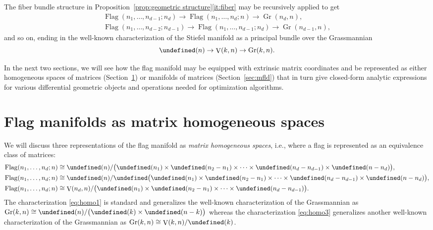 \documentclass[11pt,reqno]{amsart}%
\theoremstyle{definition}
\theoremstyle{remark}
\let\O\undefined
\let\S\undefined
\let\SO\undefined
\DeclareMathOperator{\Gr}{Gr}
\DeclareMathOperator{\V}{V}
\DeclareMathOperator{\Flag}{Flag}
\DeclareMathOperator{\O}{O}
\DeclareMathOperator{\S}{S}
\DeclareMathOperator{\SO}{SO}
\begin{document}
The fiber bundle structure in Proposition~\ref{prop:geometric structure}\eqref{it:fiber} may be recursively applied to get
\begin{gather*}
\Flag(n_1,\dots, n_{d-1};n_d) \to \Flag(n_1,\dots, n_d;n) \to \Gr(n_d,n),\\
\Flag(n_1,\dots, n_{d-2};n_{d-1}) \to \Flag(n_1,\dots, n_{d-1};n_d) \to \Gr(n_{d-1},n),
\end{gather*}
and so on, ending in the well-known characterization of the Stiefel manifold as a principal bundle over the Grassmannian
\[
\O(n) \to \V(k,n) \to \Gr(k,n).
\]

In the next two sections, we will see how the flag manifold may be equipped with extrinsic matrix coordinates and be represented as either homogeneous spaces of  matrices (Section~\ref{sec:homo}) or manifolds of matrices (Section~\ref{sec:mfld}) that in turn give closed-form analytic expressions for various differential geometric objects and operations needed for  optimization algorithms.

\section{Flag manifolds as matrix homogeneous spaces}\label{sec:homo}

We will discuss three representations of the flag manifold as \emph{matrix homogeneous spaces}, i.e., where a flag is represented as an equivalence class of matrices:
\begin{align}
\Flag(n_1,\dots,n_d;n) &\cong \O(n) / \bigl(\O(n_1) \times \O(n_2 - n_1) \times \dots \times \O(n_d - n_{d-1}) \times \O(n-n_d) \bigr), \label{eq:homo1}\\
\Flag(n_1,\dots,n_d;n) &\cong \SO(n) / \S\bigl(\O(n_1) \times \O(n_2 - n_1) \times \dots \times \O(n_d - n_{d-1}) \times \O(n-n_d) \bigr),\label{eq:homo2}\\
\Flag(n_1,\dots,n_d;n) &\cong  \V(n_d,n) / \bigl(\O(n_1) \times \O(n_2-n_1) \times \dots \times \O(n_d- n_{d-1})\bigr).\label{eq:homo3}
\end{align}
The characterization \eqref{eq:homo1} is standard \cite{Monk1959,Borel1991} and generalizes the well-known characterization of the Grassmannian as $\Gr(k,n) \cong \O(n)/\bigl(\O(k) \times \O(n-k)\bigr)$ whereas the characterization \eqref{eq:homo3} generalizes another well-known characterization of the Grassmannian as $\Gr(k,n) \cong \V(k,n)/\O(k)$.
\end{document}
